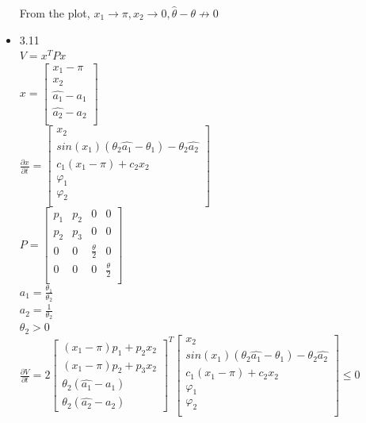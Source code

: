 \documentclass[12pt,letter]{article}
\begin{document}
\begin{itemize}
  From the plot, $x_1 \to \pi, x_2 \to 0, \hat{\theta} - \theta \not\to 0$\\
  
  \pagebreak

\item 3.11\\

$V=x^TPx$\\
  
$x=
\begin{bmatrix}
  x_1 - \pi\\
  x_2\\
  \hat{a_1}-a_1\\
  \hat{a_2}-a_2\\
\end{bmatrix}
$\\

$
\frac{\partial x}{\partial t}=
\begin{bmatrix}
  x_2\\
  sin(x_1)(\theta_2 \hat{a_1}-\theta_1)-\theta_2 \hat{a_2}\\
  c_1(x_1-\pi)+c_2 x_2\\
  \varphi_1\\
  \varphi_2\\
\end{bmatrix}
$\\

$P=
\begin{bmatrix}
  p_1 & p_2 & 0 & 0 \\
  p_2 & p_3 & 0 & 0 \\
  0 & 0 & \frac{\theta}{2} & 0\\
  0 & 0 & 0 & \frac{\theta}{2}\\
\end{bmatrix}
$\\

$a_1 = \frac{\theta_1}{\theta_2}$\\
$a_2 = \frac{1}{\theta_2}$\\
$\theta_2>0$\\

$
  \frac{\partial V}{\partial t}=
  2\begin{bmatrix}
    (x_1-\pi)p_1+p_2x_2 \\
    (x_1-\pi)p_2+p_3x_2 \\
    \theta_2(\hat{a_1}-a_1) \\
    \theta_2(\hat{a_2}-a_2)
  \end{bmatrix}^T
  \begin{bmatrix}
    x_2\\
    sin(x_1)(\theta_2 \hat{a_1}-\theta_1)-\theta_2 \hat{a_2}\\
    c_1(x_1-\pi)+c_2 x_2\\
    \varphi_1\\
    \varphi_2\\
  \end{bmatrix}
  \leq 0
$\\  


\end{itemize}
\end{document}

